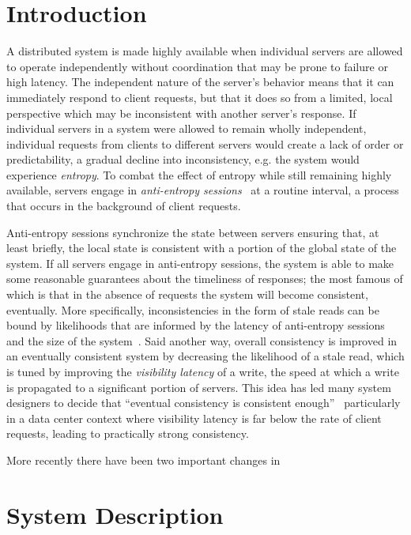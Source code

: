 \section*{Introduction}

A distributed system is made highly available when individual servers are
allowed to operate independently without coordination that may be prone to
failure or high latency.
The independent nature of the server's behavior means that it can immediately
respond to client requests, but that it does so from a limited, local
perspective which may be inconsistent with another server's response.
If individual servers in a system were allowed to remain wholly independent,
individual requests from clients to different servers would create a lack of
order or predictability, a gradual decline into inconsistency, e.g. the
system would experience \textit{entropy}.
To combat the effect of entropy while still remaining highly available,
servers engage in \textit{anti-entropy sessions}~\cite{terry_session_1994} at
a routine interval, a process that occurs in the background of client
requests.

Anti-entropy sessions synchronize the state between servers ensuring that,
at least briefly, the local state is consistent with a portion of the global
state of the system.
If all servers engage in anti-entropy sessions, the system is able to make
some reasonable guarantees about the timeliness of responses; the most famous
of which is that in the absence of requests the system will become
consistent, eventually.
More specifically, inconsistencies in the form of stale reads can be bound by
likelihoods that are informed by the latency of anti-entropy sessions and the
size of the system~\cite{bailis_quantifying_2014}.
Said another way, overall consistency is improved in an eventually consistent
system by decreasing the likelihood of a stale read, which is tuned by
improving the \textit{visibility latency} of a write, the speed at which a
write is propagated to a significant portion of servers.
This idea has led many system designers to decide that ``eventual consistency
is consistent enough''~\cite{bermbach_eventual_2011,wada2011data}
particularly in a data center context where visibility latency is far below
the rate of client requests, leading to practically strong consistency.

More recently there have been two important changes in

\section*{System Description}

